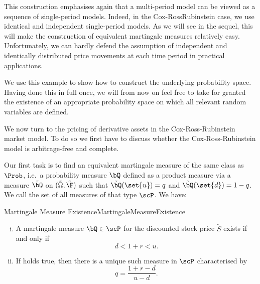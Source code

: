 This construction emphasises again that a multi-period model can be
viewed as a sequence of single-period models. Indeed, in the Cox-RossRubinstein case, we use identical and independent single-period models. As we will see in the sequel, this will make the construction of equivalent martingale measures relatively easy. Unfortunately, we can hardly defend the assumption of independent and identically distributed price movements at each time period
in practical applications.

\begin{xattention}
	We use this example to show how to construct the underlying probability space. Having done this in full once, we will from now on feel free to take for granted the existence of an appropriate probability space on which all relevant random variables are defined.
\end{xattention}

We now turn to the pricing of derivative assets in the Cox-Ross-Rubinstein market model. To do so we first have to discuss whether the Cox-Ross-Rubinstein model is arbitrage-free and complete.

Our first task is to find an equivalent martingale measure of the same class as $\Prob$, i.e.\ a probability measure $\bQ$ defined as a product measure via a measure $\tilde{\bQ}$ on $(\tilde{\Omega}, \tilde{\F})$ such that $\tilde{\bQ}(\set{u}) = q$ and $\tilde{\bQ}(\set{d}) = 1-q$. We call the set of all measures of that type $\scP$. We have:

\begin{prop}{Martingale Measure Existence}{MartingaleMeasureExistence}
	\begin{enumerate}[(i)]
		\item A martingale measure $\bQ \in \scP$ for the discounted stock price $\tilde{S}$ exists if and only if
		      \begin{equation}
			      d < 1+r < u.
			      \label{eq:CRRNoArb}
		      \end{equation}
		\item If  holds true, then there is a unique such measure in $\scP$ characterised by
		      \begin{equation}
			      q = \frac{1+r-d}{u-d}.
		      \end{equation}
	\end{enumerate}
\end{prop}

